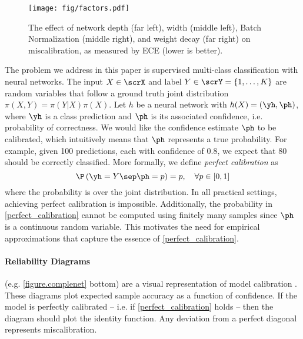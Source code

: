 \label{sec:definitions}

 \setlength{\abovedisplayskip}{4pt}
 \setlength{\belowdisplayskip}{4pt}
 \setlength{\textfloatsep}{4pt}

\begin{figure*}[t!]
  \centering
  \texttt{[image: fig/factors.pdf]}
  \caption{The effect of network depth (far left), width (middle left), Batch Normalization (middle right), and weight decay (far right) on miscalibration, as measured by ECE (lower is better).}
  \label{figure.factors}
  \vspace*{-2ex}
\end{figure*}

The problem we address in this paper is supervised multi-class classification with neural networks. The input $X\in\scrX$ and label $Y\in\scrY=\{1, \ldots, K\}$ are random variables that follow a ground truth joint distribution $\pi(X,Y) = \pi(Y|X) \pi(X)$.
Let $h$ be a neural network with $h(X) = (\yh, \ph)$, where $\yh$ is a class prediction and $\ph$ is its associated confidence, i.e. probability of correctness.
We would like the confidence estimate $\ph$ to be calibrated, which intuitively means that $\ph$ represents a true probability. For example, given 100 predictions, each with confidence of $0.8$, we expect that $80$ should be correctly classified.
More formally, we define \emph{perfect calibration} as
\begin{equation}
\label{perfect_calibration}
\P \left(\yh=Y\sep \ph = p\right)=p,\quad\forall p \in [0,1]
\end{equation}
where the probability is over the joint distribution.
In all practical settings, achieving perfect calibration is impossible.
Additionally, the probability in \eqref{perfect_calibration} cannot be computed using finitely many samples since $\ph$ is a continuous random variable. This motivates the need for empirical approximations that capture the essence of \eqref{perfect_calibration}.

\paragraph{Reliability Diagrams} (e.g. \autoref{figure.complenet} bottom)
are a visual representation of model calibration \citep{degroot1983comparison,niculescu2005predicting}.
These diagrams plot expected sample accuracy as a function of confidence.
If the model is perfectly calibrated -- i.e. if \eqref{perfect_calibration} holds -- then the diagram should plot the identity function. Any deviation from a perfect diagonal represents miscalibration.

